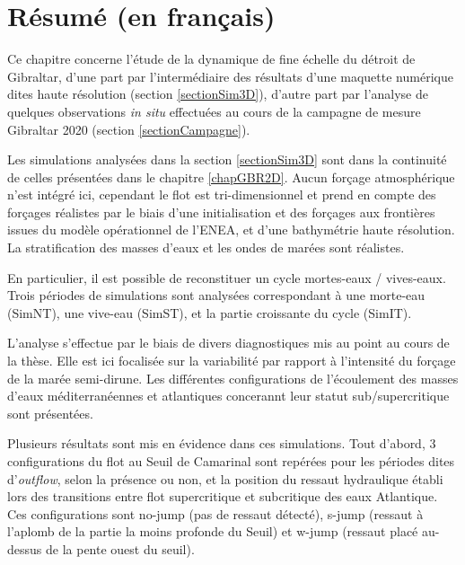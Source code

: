\hypersetup{pdfborder=0 0 0}

\section{Résumé (en français)}

Ce chapitre concerne l'étude de la dynamique de fine échelle du détroit de Gibraltar, d'une part par l'intermédiaire des résultats d'une maquette numérique dites haute résolution (section \ref{sectionSim3D}), d'autre part par l'analyse de quelques observations \textit{in situ} effectuées au cours de la campagne de mesure Gibraltar 2020 (section \ref{sectionCampagne}).

Les simulations analysées dans la section \ref{sectionSim3D} sont dans la continuité de celles présentées dans le chapitre \ref{chapGBR2D}. Aucun forçage atmosphérique n'est intégré ici, cependant le flot est tri-dimensionnel et prend en compte des forçages réalistes par le biais d'une initialisation et des forçages aux frontières issues du modèle opérationnel de l'ENEA, et d'une bathymétrie haute résolution. La stratification des masses d'eaux et les ondes de marées sont réalistes.

En particulier, il est possible de reconstituer un cycle mortes-eaux / vives-eaux. Trois périodes de simulations sont analysées correspondant à une morte-eau (SimNT), une vive-eau (SimST), et la partie croissante du cycle (SimIT).

L'analyse s'effectue par le biais de divers diagnostiques mis au point au cours de la thèse. Elle est ici focalisée sur la variabilité par rapport à l'intensité du forçage de la marée semi-dirune. Les différentes configurations de l'écoulement des masses d'eaux méditerranéennes et atlantiques concerannt leur statut sub/supercritique sont présentées. 

Plusieurs résultats sont mis en évidence dans ces simulations. Tout d'abord, 3 configurations du flot au Seuil de Camarinal sont repérées pour les périodes dites d'\textit{outflow}, selon la présence ou non, et la position du ressaut hydraulique établi lors des transitions entre flot supercritique et subcritique des eaux Atlantique. Ces configurations sont no-jump (pas de ressaut détecté), s-jump (ressaut à l'aplomb de la partie la moins profonde du Seuil) et w-jump (ressaut placé au-dessus de la pente ouest du seuil).

